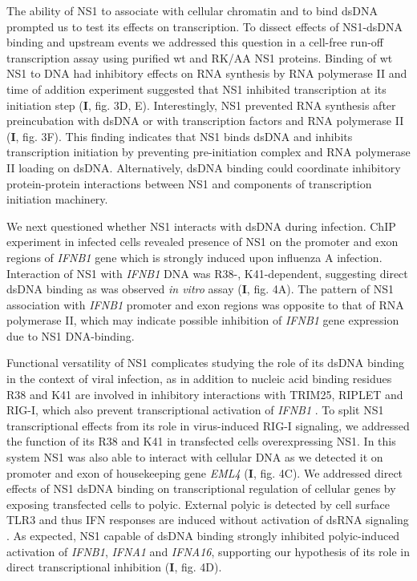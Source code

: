 		The ability of NS1 to associate with cellular chromatin and to bind dsDNA prompted us to test its effects on transcription. To dissect effects of  NS1-dsDNA binding and upstream events we addressed this question in a cell-free run-off transcription assay using purified \gls{wt} and RK/AA NS1 proteins. Binding of wt NS1 to DNA had inhibitory effects on RNA synthesis by RNA polymerase II and time of addition experiment suggested that NS1 inhibited transcription at its initiation step (\textbf{I}, fig. 3D, E). Interestingly, NS1 prevented RNA synthesis after preincubation  with dsDNA or with transcription factors and RNA polymerase II (\textbf{I}, fig. 3F). This finding indicates that NS1 binds dsDNA and inhibits transcription initiation by preventing pre-initiation complex and RNA polymerase II loading on dsDNA. Alternatively, dsDNA binding could coordinate inhibitory protein-protein interactions between NS1 and components of transcription initiation machinery. 
		
		We next questioned whether NS1 interacts with dsDNA during infection. \Gls{ChIP} experiment in infected cells revealed presence of NS1 on the promoter and exon regions of \textit{IFNB1} gene which is strongly induced upon influenza A infection. Interaction of NS1 with \textit{IFNB1} DNA was R38-, K41-dependent, suggesting direct dsDNA binding as was observed \textit{in vitro} assay (\textbf{I}, fig. 4A). The pattern of NS1 association with \textit{IFNB1} promoter and exon regions was opposite to that of RNA polymerase II, which may indicate possible inhibition of \textit{IFNB1} gene expression due to NS1 DNA-binding. 
		
		Functional versatility of NS1 complicates studying the role of its dsDNA binding in the context of viral infection, as in addition to nucleic acid binding residues R38 and K41 are involved in inhibitory interactions with TRIM25, RIPLET and \gls{RIG-I}, which also prevent transcriptional activation of \textit{IFNB1} \parencite{Gack2009, Rajsbaum2012}. To split NS1 transcriptional effects from its role in virus-induced \gls{RIG-I} signaling, we addressed the function of its R38 and K41 in transfected cells overexpressing NS1. In this system NS1 was also able to interact with cellular DNA as we detected it on promoter and exon of housekeeping gene \textit{EML4} (\textbf{I}, fig. 4C). We addressed direct effects of NS1 dsDNA binding on transcriptional regulation of cellular genes by exposing transfected cells to \gls{polyic}. External \gls{polyic} is detected by cell surface \gls{TLR}3  and thus \gls{IFN} responses are induced without activation of dsRNA signaling \parencite{Karpala2005}. As expected, NS1 capable of dsDNA binding strongly inhibited \gls{polyic}-induced activation of \textit{IFNB1}, \textit{IFNA1} and \textit{IFNA16}, supporting our hypothesis of its role in direct transcriptional inhibition (\textbf{I}, fig. 4D).
		
